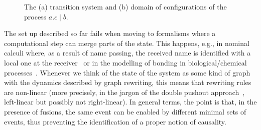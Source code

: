 \begin{figure}
  \caption{The (a) transition system and (b) domain of configurations
    of the process $a.c \mid b$.}
  \label{fi:ccs}
\end{figure}


The set up described so far fails when moving to formalisms where a
computational step can merge parts of the state. This happens, e.g.,
in nominal calculi where, as a result of name passing,
the received name is identified with a local one at the
receiver~\cite{CVY:ESSPE,Gad07} or in the modelling of bonding in biological/chemical processes~\cite{PUY:MBPE}.
%
Whenever we think of the state of the system as some kind of graph
with the dynamics described by graph rewriting, this means that rewriting rules
are non-linear (more precisely, in the jargon of the double pushout
approach~\cite{Ehr:TIAA}, left-linear but possibly not right-linear).
%
%
In general terms, the point is that, in the presence of fusions, the
same event can be enabled by different minimal sets of events, thus
preventing the identification of a proper notion of causality.

